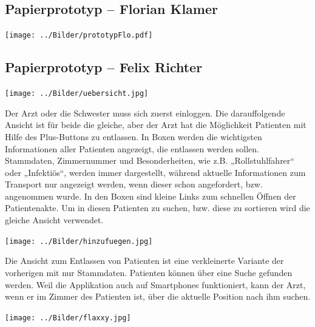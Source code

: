\documentclass[a4paper, ngerman, 12pt]{scrartcl}
\begin{document}
\subsection{Papierprototyp – Florian Klamer}
\begin{center}
\begin{minipage}[b]{0.7\textwidth}
	\centering
	\texttt{[image: ../Bilder/prototypFlo.pdf]}
	\label{img:klamer}
\end{minipage}
\end{center}
\subsection{Papierprototyp – Felix Richter}
\begin{center}
\begin{minipage}[b]{0.7\textwidth}
	\centering
	\texttt{[image: ../Bilder/uebersicht.jpg]}
	\label{img:richter1}
\end{minipage}
\end{center}
Der Arzt oder die Schwester muss sich zuerst einloggen. Die darauffolgende Ansicht ist für beide die gleiche, aber der Arzt hat die Möglichkeit Patienten mit Hilfe des Plus-Buttons zu entlassen. In Boxen werden die wichtigsten Informationen aller Patienten angezeigt, die entlassen werden sollen. Stammdaten, Zimmernummer und Besonderheiten, wie z.B. „Rollstuhlfahrer“ oder „Infektiös“, werden immer dargestellt, während aktuelle Informationen zum Transport nur angezeigt werden, wenn dieser schon angefordert, bzw. angenommen wurde. In den Boxen sind kleine Links zum schnellen Öffnen der Patientenakte. Um in diesen Patienten zu suchen, bzw. diese zu sortieren wird die gleiche Ansicht verwendet.\\
\begin{center}
\begin{minipage}[b]{0.8\textwidth}
	\centering
	\texttt{[image: ../Bilder/hinzufuegen.jpg]}
	\label{img:richter2}
\end{minipage}
\end{center}
Die Ansicht zum Entlassen von Patienten ist eine verkleinerte Variante der vorherigen mit nur Stammdaten. Patienten können über eine Suche gefunden werden. Weil die Applikation auch auf Smartphones funktioniert, kann der Arzt, wenn er im Zimmer des Patienten ist, über die aktuelle Position nach ihm suchen.\\[1.5em]
\begin{minipage}{0.4\textwidth}
	\centering
	\texttt{[image: ../Bilder/flaxxy.jpg]}
	\label{img:richter2}
\end{minipage}
\end{document}
